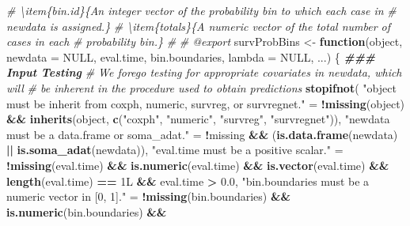 \documentclass[
]{book}
\newenvironment{Shaded}{\begin{snugshade}}{\end{snugshade}}
\newcommand{\AttributeTok}[1]{\textcolor[rgb]{0.13,0.29,0.53}{#1}}
\newcommand{\CommentTok}[1]{\textcolor[rgb]{0.56,0.35,0.01}{\textit{#1}}}
\newcommand{\ConstantTok}[1]{\textcolor[rgb]{0.56,0.35,0.01}{#1}}
\newcommand{\ControlFlowTok}[1]{\textcolor[rgb]{0.13,0.29,0.53}{\textbf{#1}}}
\newcommand{\DocumentationTok}[1]{\textcolor[rgb]{0.56,0.35,0.01}{\textbf{\textit{#1}}}}
\newcommand{\FloatTok}[1]{\textcolor[rgb]{0.00,0.00,0.81}{#1}}
\newcommand{\FunctionTok}[1]{\textcolor[rgb]{0.13,0.29,0.53}{\textbf{#1}}}
\newcommand{\NormalTok}[1]{#1}
\newcommand{\OtherTok}[1]{\textcolor[rgb]{0.56,0.35,0.01}{#1}}
\newcommand{\SpecialCharTok}[1]{\textcolor[rgb]{0.81,0.36,0.00}{\textbf{#1}}}
\newcommand{\StringTok}[1]{\textcolor[rgb]{0.31,0.60,0.02}{#1}}
\begin{document}
\begin{Shaded}
\begin{Highlighting}[]
\CommentTok{\#\textquotesingle{} \textbackslash{}item\{bin.id\}\{An integer vector of the probability bin to which each case in }
\CommentTok{\#\textquotesingle{}   \textasciigrave{}newdata\textasciigrave{} is assigned.\}}
\CommentTok{\#\textquotesingle{} \textbackslash{}item\{totals\}\{A numeric vector of the total number of cases in each }
\CommentTok{\#\textquotesingle{}   probability bin.\}}
\CommentTok{\#\textquotesingle{} }
\CommentTok{\#\textquotesingle{} @export}
\NormalTok{survProbBins }\OtherTok{\textless{}{-}} \ControlFlowTok{function}\NormalTok{(object, }\AttributeTok{newdata =} \ConstantTok{NULL}\NormalTok{, eval.time, bin.boundaries, }
                         \AttributeTok{lambda =} \ConstantTok{NULL}\NormalTok{, ...) \{ }
  \DocumentationTok{\#\#\# Input Testing}
  \CommentTok{\# We forego testing for appropriate covariates in \textasciigrave{}newdata\textasciigrave{}, which will}
  \CommentTok{\#   be inherent in the procedure used to obtain predictions}
  \FunctionTok{stopifnot}\NormalTok{(}
    \StringTok{"\textasciigrave{}object\textasciigrave{} must be inherit from \textasciigrave{}coxph\textasciigrave{}, \textasciigrave{}numeric\textasciigrave{}, \textasciigrave{}survreg\textasciigrave{}, or \textasciigrave{}survregnet\textasciigrave{}."} \OtherTok{=}
      \SpecialCharTok{!}\FunctionTok{missing}\NormalTok{(object) }\SpecialCharTok{\&\&} \FunctionTok{inherits}\NormalTok{(object, }\FunctionTok{c}\NormalTok{(}\StringTok{"coxph"}\NormalTok{, }\StringTok{"numeric"}\NormalTok{, }\StringTok{"survreg"}\NormalTok{, }\StringTok{"survregnet"}\NormalTok{)),}
    \StringTok{"\textasciigrave{}newdata\textasciigrave{} must be a data.frame or soma\_adat."} \OtherTok{=} 
      \SpecialCharTok{!}\NormalTok{missing }\SpecialCharTok{\&\&}\NormalTok{ (}\FunctionTok{is.data.frame}\NormalTok{(newdata) }\SpecialCharTok{||} \FunctionTok{is.soma\_adat}\NormalTok{(newdata)),}
    \StringTok{"\textasciigrave{}eval.time\textasciigrave{} must be a positive scalar."} \OtherTok{=} 
      \SpecialCharTok{!}\FunctionTok{missing}\NormalTok{(eval.time) }\SpecialCharTok{\&\&} \FunctionTok{is.numeric}\NormalTok{(eval.time) }\SpecialCharTok{\&\&} 
        \FunctionTok{is.vector}\NormalTok{(eval.time) }\SpecialCharTok{\&\&} \FunctionTok{length}\NormalTok{(eval.time) }\SpecialCharTok{==}\NormalTok{ 1L }\SpecialCharTok{\&\&}\NormalTok{ eval.time }\SpecialCharTok{\textgreater{}} \FloatTok{0.0}\NormalTok{,}
    \StringTok{"\textasciigrave{}bin.boundaries\textasciigrave{} must be a numeric vector in [0, 1]."} \OtherTok{=} 
      \SpecialCharTok{!}\FunctionTok{missing}\NormalTok{(bin.boundaries) }\SpecialCharTok{\&\&} \FunctionTok{is.numeric}\NormalTok{(bin.boundaries) }\SpecialCharTok{\&\&} 

\end{Highlighting}
\end{Shaded}
\end{document}
